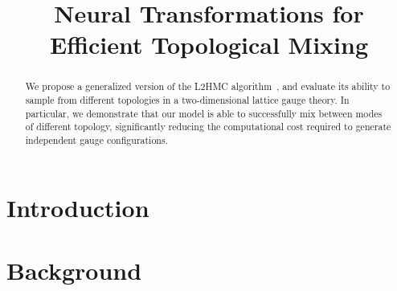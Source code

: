 \documentclass{article} %
\title{Neural Transformations for \\Efficient Topological Mixing}%
\author{Sam Foreman, Xiao-Yong Jin\& James Osborn\thanks{\hyperref{%
      https://github.com/saforem2/l2hmc-qcd
   }{https://github.com/saforem2/l2hmc-qcd} \\
   Leadership Computing Facility\\
   Argonne National Laboratory\\
   Lemont, IL 60439
   \texttt{\{foremans,xjin,\}@anl.gov},%
   \texttt{\{osborn\}@alcf.anl.gov}\\
}}
\begin{document}
\maketitle

\begin{abstract}
   We propose a generalized version of the L2HMC algorithm~\citep{levy2017}, and evaluate its ability to sample from
   different topologies in a two-dimensional lattice gauge theory.
   In particular, we demonstrate that our model is able to successfully mix between modes of different topology,
   significantly reducing the computational cost required to generate independent gauge configurations.
\end{abstract}

\section{\label{sec:introduction}Introduction}
\color{red}{TODO: Complete introduction}\color{black}
%
\section{\label{sec:background}Background}
\end{document}
